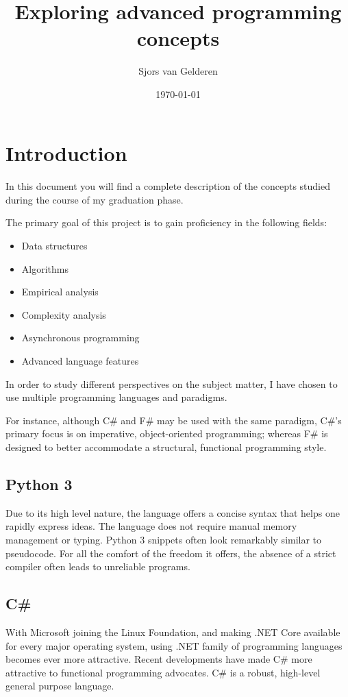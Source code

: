 \documentclass{article}
\author{Sjors van Gelderen}
\title{Exploring advanced programming concepts}
\date{\today{}}
\begin{document}
\maketitle{}
\tableofcontents{}

\section{Introduction}
\paragraph{}
In this document you will find a complete description of the concepts studied during the course of my graduation phase.

The primary goal of this project is to gain proficiency in the following fields:
\begin{itemize}
\item Data structures
\item Algorithms
\item Empirical analysis
\item Complexity analysis
\item Asynchronous programming
\item Advanced language features
\end{itemize}

In order to study different perspectives on the subject matter,
I have chosen to use multiple programming languages and paradigms.

For instance, although C\# and F\# may be used with the same paradigm,
C\#'s primary focus is on imperative, object-oriented programming;
whereas F\# is designed to better accommodate a structural, functional programming style.

\subsection{Python 3}
Due to its high level nature, the language offers a concise syntax that helps one rapidly express ideas.
The language does not require manual memory management or typing.
Python 3 snippets often look remarkably similar to pseudocode.
For all the comfort of the freedom it offers, the absence of a strict compiler often leads to unreliable programs.

\subsection{C\#}
With Microsoft joining the Linux Foundation, and making .NET Core available for every major operating system,
using .NET family of programming languages becomes ever more attractive.
Recent developments have made C\# more attractive to functional programming advocates.
C\# is a robust, high-level general purpose language.
\end{document}
